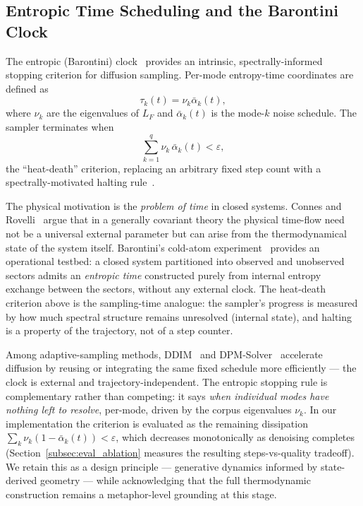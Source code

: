 \documentclass[12pt,a4paper]{article}
\begin{document}
\subsection{Entropic Time Scheduling and the Barontini Clock}
\label{subsec:bg_clock}

The entropic (Barontini) clock~\cite{barontini2026,stancevic2025} provides
an intrinsic, spectrally-informed stopping criterion for diffusion
sampling. Per-mode entropy-time coordinates are defined as
\begin{equation}
  \tau_k(t) = \nu_k \bar{\alpha}_k(t),
  \label{eq:entropic_time}
\end{equation}
where $\nu_k$ are the eigenvalues of $L_F$ and $\bar{\alpha}_k(t)$ is the
mode-$k$ noise schedule. The sampler terminates when
\begin{equation}
  \sum_{k=1}^{q} \nu_k \, \bar{\alpha}_k(t) < \varepsilon,
  \label{eq:heat_death}
\end{equation}
the ``heat-death'' criterion, replacing an arbitrary fixed step count
with a spectrally-motivated halting rule~\cite{lsd,aldsc}.

The physical motivation is the \emph{problem of time} in closed systems.
Connes and Rovelli~\cite{connesrovelli1994} argue that in a generally
covariant theory the physical time-flow need not be a universal external
parameter but can arise from the thermodynamical state of the system
itself. Barontini's cold-atom experiment~\cite{barontini2026} provides an
operational testbed: a closed system partitioned into observed and
unobserved sectors admits an \emph{entropic time} constructed purely from
internal entropy exchange between the sectors, without any external
clock. The heat-death criterion above is the sampling-time analogue: the
sampler's progress is measured by how much spectral structure remains
unresolved (internal state), and halting is a property of the trajectory,
not of a step counter.

Among adaptive-sampling methods, DDIM~\cite{song2020} and
DPM-Solver~\cite{lu2022} accelerate diffusion by reusing or integrating
the same fixed schedule more efficiently — the clock is external and
trajectory-independent. The entropic stopping rule is complementary
rather than competing: it says \emph{when individual modes have nothing
left to resolve}, per-mode, driven by the corpus eigenvalues $\nu_k$. In
our implementation the criterion is evaluated as the remaining
dissipation $\sum_k \nu_k (1 - \bar{\alpha}_k(t)) < \varepsilon$, which
decreases monotonically as denoising completes
(Section~\ref{subsec:eval_ablation} measures the resulting
steps-vs-quality tradeoff). We retain this as a design principle —
generative dynamics informed by state-derived geometry — while
acknowledging that the full thermodynamic construction remains a
metaphor-level grounding at this stage.
\end{document}
